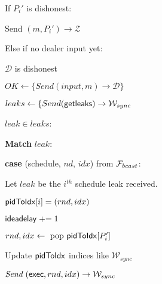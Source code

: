 
\begin{bbox}[title={Algorithm $\msf{SimPartyOutput}(m, P_i')$}]

	\begin{renumerate}
		\item If $P_i'$ is dishonest:
			
			\quad Send $(m, P_i') \rightarrow \mathcal{Z}$

		\item Else if no dealer input yet:

			\quad \Assert $\mathcal{D}$ is dishonest

			\quad $OK \leftarrow \{ Send (input, m) \rightarrow \mathcal{D} \}$

			\quad $leaks \leftarrow \{ Send ({\mathsf {getleaks}}) \rightarrow \mathcal{W}_{sync}$
		
			 $leak \in leaks$:
				\begin{renumerate}
					\item {\bf Match} $leak$:
						\begin{renumerate}
							\item {\bf case} (schedule, $nd$, $idx$) from $\mathcal{F}_{bcast}$:

								\quad Let $leak$ be the $i^{th}$ schedule leak received.

								\quad ${\mathsf {pidToIdx}}[i] = (rnd, idx)$

								\quad ${\mathsf {ideadelay}} \mathrel{+}= 1$
						\end{renumerate}
				\end{renumerate}
		\item $rnd,idx \leftarrow \text{ pop } {\mathsf {pidToIdx}}[P_i']$

		\item Update ${\mathsf {pidToIdx}}$ indices like $\mathcal{W}_{sync}$

		\item $\emph{Send}~ ({\mathsf {exec}}, rnd, idx) \rightarrow \mathcal{W}_{sync}$
		
	\end{renumerate}

\end{bbox}
